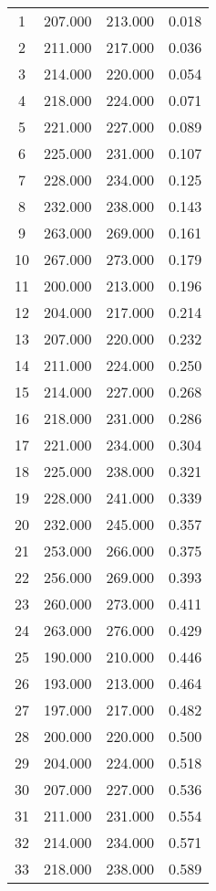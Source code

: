 % 
\begin{tabular}{cccc}
  \hline
  \hline
1 & 207.000 & 213.000 & 0.018 \\ 
  2 & 211.000 & 217.000 & 0.036 \\ 
  3 & 214.000 & 220.000 & 0.054 \\ 
  4 & 218.000 & 224.000 & 0.071 \\ 
  5 & 221.000 & 227.000 & 0.089 \\ 
  6 & 225.000 & 231.000 & 0.107 \\ 
  7 & 228.000 & 234.000 & 0.125 \\ 
  8 & 232.000 & 238.000 & 0.143 \\ 
  9 & 263.000 & 269.000 & 0.161 \\ 
  10 & 267.000 & 273.000 & 0.179 \\ 
  11 & 200.000 & 213.000 & 0.196 \\ 
  12 & 204.000 & 217.000 & 0.214 \\ 
  13 & 207.000 & 220.000 & 0.232 \\ 
  14 & 211.000 & 224.000 & 0.250 \\ 
  15 & 214.000 & 227.000 & 0.268 \\ 
  16 & 218.000 & 231.000 & 0.286 \\ 
  17 & 221.000 & 234.000 & 0.304 \\ 
  18 & 225.000 & 238.000 & 0.321 \\ 
  19 & 228.000 & 241.000 & 0.339 \\ 
  20 & 232.000 & 245.000 & 0.357 \\ 
  21 & 253.000 & 266.000 & 0.375 \\ 
  22 & 256.000 & 269.000 & 0.393 \\ 
  23 & 260.000 & 273.000 & 0.411 \\ 
  24 & 263.000 & 276.000 & 0.429 \\ 
  25 & 190.000 & 210.000 & 0.446 \\ 
  26 & 193.000 & 213.000 & 0.464 \\ 
  27 & 197.000 & 217.000 & 0.482 \\ 
  28 & 200.000 & 220.000 & 0.500 \\ 
  29 & 204.000 & 224.000 & 0.518 \\ 
  30 & 207.000 & 227.000 & 0.536 \\ 
  31 & 211.000 & 231.000 & 0.554 \\ 
  32 & 214.000 & 234.000 & 0.571 \\ 
  33 & 218.000 & 238.000 & 0.589 \\ 

\end{tabular}
